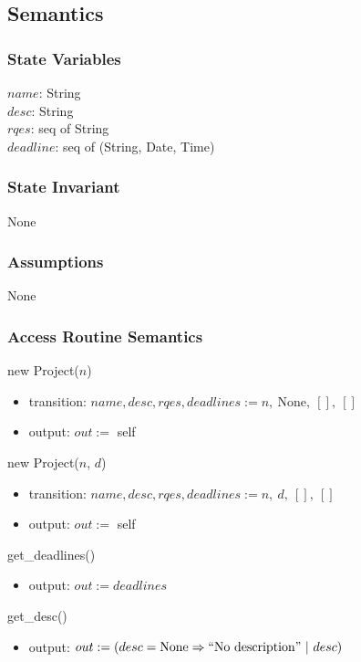 \documentclass[12pt, titlepage]{article}
\begin{document}
\subsection*{Semantics}
\subsubsection*{State Variables}
$name$: String\\
$desc$: String\\
$rqes$: seq of String\\
$deadline$: seq of (String, Date, Time)

\subsubsection*{State Invariant}
None

\subsubsection*{Assumptions}
None

\subsubsection*{Access Routine Semantics}
\noindent new Project($n$)
\begin{itemize}
    \item transition: $name, desc, rqes, deadlines := n,\ \text{None},\ [],\ []$
    \item output: $out :=$ self
\end{itemize}

\noindent new Project($n$, $d$)
\begin{itemize}
    \item transition: $name, desc, rqes, deadlines := n,\ d,\ [],\ []$
    \item output: $out :=$ self
\end{itemize}

\noindent get\_deadlines()
\begin{itemize}
    \item output: $out := deadlines$
\end{itemize}

\noindent get\_desc()
\begin{itemize}
    \item output: $out := (desc = \text{None} \Rightarrow ``\text{No description}"\ |\ desc)$
\end{itemize}
\end{document}
